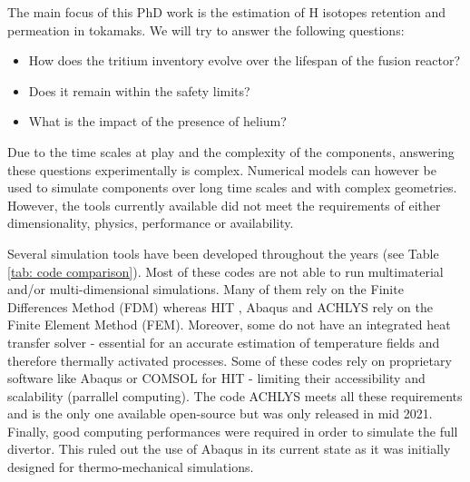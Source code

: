 The main focus of this PhD work is the estimation of H isotopes retention and permeation in tokamaks.
We will try to answer the following questions:
\begin{itemize}
    \item How does the tritium inventory evolve over the lifespan of the fusion reactor?
    \item Does it remain within the safety limits?
    \item What is the impact of the presence of helium?
\end{itemize}

Due to the time scales at play and the complexity of the components, answering these questions experimentally is complex.
Numerical models can however be used to simulate components over long time scales and with complex geometries.
However, the tools currently available did not meet the requirements of either dimensionality, physics, performance or availability.

Several simulation tools have been developed throughout the years (see Table \ref{tab: code comparison}).
Most of these codes are not able to run multimaterial and/or multi-dimensional simulations.
Many of them rely on the Finite Differences Method (FDM) whereas HIT , Abaqus  and ACHLYS  rely on the Finite Element Method (FEM).
Moreover, some do not have an integrated heat transfer solver - essential for an accurate estimation of temperature fields and therefore thermally activated processes.
Some of these codes rely on proprietary software like Abaqus or COMSOL for HIT - limiting their accessibility and scalability (parrallel computing).
The code ACHLYS meets all these requirements and is the only one available open-source but was only released in mid 2021.
Finally, good computing performances were required in order to simulate the full divertor.
This ruled out the use of Abaqus in its current state as it was initially designed for thermo-mechanical simulations.

